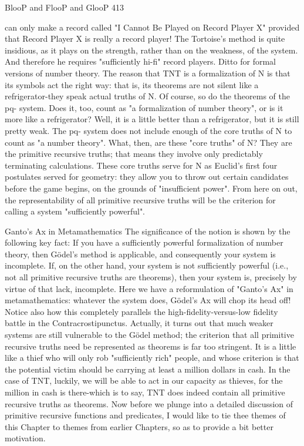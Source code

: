 BlooP and FlooP and GlooP                                                               413

can only make a record called "I Cannot Be Played on Record Player X" provided that
Record Player X is really a record player! The Tortoise's method is quite insidious, as it
plays on the strength, rather than on the weakness, of the system. And therefore he
requires "sufficiently hi-fi" record players.
        Ditto for formal versions of number theory. The reason that TNT is a
formalization of N is that its symbols act the right way: that is, its theorems are not silent
like a refrigerator-they speak actual truths of N. Of course, so do the theorems of the pq-
system. Does it, too, count as "a formalization of number theory", or is it more like a
refrigerator? Well, it is a little better than a refrigerator, but it is still pretty weak. The pq-
system does not include enough of the core truths of N to count as "a number theory".
        What, then, are these "core truths" of N? They are the primitive recursive truths;
that means they involve only predictably terminating calculations. These core truths
serve for N as Euclid's first four postulates served for geometry: they allow you to throw
out certain candidates before the game begins, on the grounds of "insufficient power".
From here on out, the representability of all primitive recursive truths will be the
criterion for calling a system "sufficiently powerful".

                           Ganto's Ax in Metamathematics
The significance of the notion is shown by the following key fact: If you have a
sufficiently powerful formalization of number theory, then Gödel’s method is applicable,
and consequently your system is incomplete. If, on the other hand, your system is not
sufficiently powerful (i.e., not all primitive recursive truths are theorems), then your
system is, precisely by virtue of that lack, incomplete. Here we have a reformulation of
"Ganto's Ax" in metamathematics: whatever the system does, Gödel’s Ax will chop its
head off! Notice also how this completely parallels the high-fidelity-versus-low fidelity
battle in the Contracrostipunctus.
Actually, it turns out that much weaker systems are still vulnerable to the Gödel method;
the criterion that all primitive recursive truths need be represented as theorems is far too
stringent. It is a little like a thief who will only rob "sufficiently rich" people, and whose
criterion is that the potential victim should be carrying at least a million dollars in cash.
In the case of TNT, luckily, we will be able to act in our capacity as thieves, for the
million in cash is there-which is to say, TNT does indeed contain all primitive recursive
truths as theorems.
        Now before we plunge into a detailed discussion of primitive recursive functions
and predicates, I would like to tie thee themes of this Chapter to themes from earlier
Chapters, so as to provide a bit better motivation.

